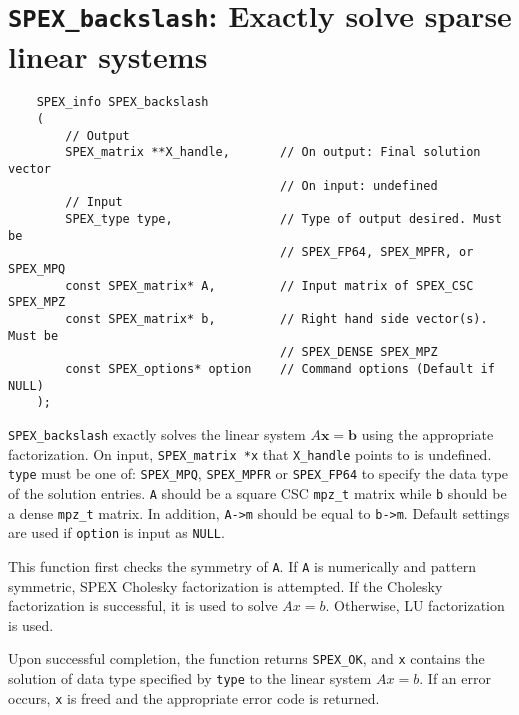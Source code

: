 \documentclass[12pt,oneside]{book}
\theoremstyle{definition}
\begin{document}
\section{\texttt{SPEX\_backslash}: Exactly solve sparse linear systems}
\begin{mdframed}[userdefinedwidth=\textwidth]
{\footnotesize
\begin{verbatim}
    SPEX_info SPEX_backslash
    (
        // Output
        SPEX_matrix **X_handle,       // On output: Final solution vector
                                      // On input: undefined
        // Input
        SPEX_type type,               // Type of output desired. Must be
                                      // SPEX_FP64, SPEX_MPFR, or SPEX_MPQ
        const SPEX_matrix* A,         // Input matrix of SPEX_CSC SPEX_MPZ
        const SPEX_matrix* b,         // Right hand side vector(s). Must be
                                      // SPEX_DENSE SPEX_MPZ 
        const SPEX_options* option    // Command options (Default if NULL)
    );
\end{verbatim}
} \end{mdframed}

\verb|SPEX_backslash| exactly solves the linear system $A \mathbf{x} = \mathbf{b}$ using the appropriate factorization. On input, \verb|SPEX_matrix *x| that \verb|X_handle| points to is undefined. \verb|type| must be one of:
\verb|SPEX_MPQ|, \verb|SPEX_MPFR| or \verb|SPEX_FP64| to specify the data type
of the solution entries. \verb|A| should be a square CSC \verb|mpz_t| matrix
while \verb|b| should be a dense \verb|mpz_t| matrix. In addition, \verb|A->m|
should be equal to \verb|b->m|.  Default settings are used if
\verb|option| is input as \verb|NULL|.


This function first checks the symmetry of \verb|A|. If \verb|A| is numerically and pattern symmetric, SPEX Cholesky factorization is attempted. If the Cholesky factorization is successful, it is used to solve $A x = b$. Otherwise, LU factorization is used. 

Upon successful completion, the function returns \verb|SPEX_OK|, and
\verb|x| contains the solution of data type specified by
\verb|type| to the linear system $Ax=b$. If an error occurs, \verb|x| is freed and the appropriate error code is returned.
\end{document}
